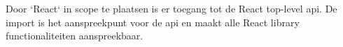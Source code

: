 \chapter{}
\label{ch:react}







\section{}
\label{sec:reactComponenten}

Door `React` in scope te plaatsen is er toegang tot de React top-level \gls{api}. De import is het aanspreekpunt voor de \gls{api} en maakt alle React library functionaliteiten aanspreekbaar.

